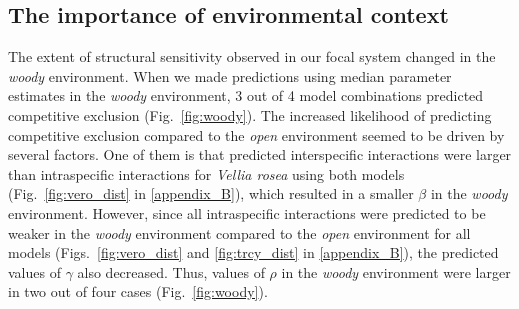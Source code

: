 \begin{refsection}

\subsection*{The importance of environmental context}

The extent of structural sensitivity observed in our focal system changed in the \textit{woody} environment. When we made predictions using median parameter estimates in the  \textit{woody} environment, 3 out of 4 model combinations  predicted competitive exclusion (Fig.~\ref{fig:woody}). The increased likelihood of predicting competitive exclusion compared to the \textit{open} environment seemed to be driven by several factors. One of them is that predicted interspecific interactions were larger than intraspecific interactions for \textit{Vellia rosea} using both models (Fig.~\ref{fig:vero_dist} in \autoref{appendix_B}), which resulted in a smaller $\beta$ in the \textit{woody} environment. However, since all intraspecific interactions were predicted to be weaker in the \textit{woody} environment compared to the \textit{open} environment for all models (Figs.~\ref{fig:vero_dist} and \ref{fig:trcy_dist} in \autoref{appendix_B}), the predicted values of $\gamma$ also decreased. Thus, values of $\rho$ in the \textit{woody} environment were larger in two out of four cases (Fig.~\ref{fig:woody}).


\end{refsection}
